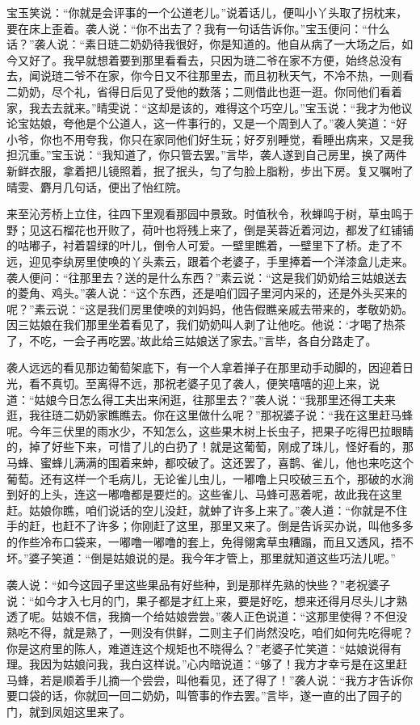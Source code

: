 宝玉笑说：“你就是会评事的一个公道老儿。”说着话儿，便叫小丫头取了拐枕来，要在床上歪着。袭人说：“你不出去了？我有一句话告诉你。”宝玉便问：“什么话？”袭人说：“素日琏二奶奶待我很好，你是知道的。他自从病了一大场之后，如今又好了。我早就想着要到那里看看去，只因为琏二爷在家不方便，始终总没有去，闻说琏二爷不在家，你今日又不往那里去，而且初秋天气，不冷不热，一则看二奶奶，尽个礼，省得日后见了受他的数落；二则借此也逛一逛。你同他们看着家，我去去就来。”晴雯说：“这却是该的，难得这个巧空儿。”宝玉说：“我才为他议论宝姑娘，夸他是个公道人，这一件事行的，又是一个周到人了。”袭人笑道：“好小爷，你也不用夸我，你只在家同他们好生玩；好歹别睡觉，看睡出病来，又是我担沉重。”宝玉说：“我知道了，你只管去罢。”言毕，袭人遂到自己房里，换了两件新鲜衣服，拿着把儿镜照着，抿了抿头，匀了匀脸上脂粉，步出下房。复又嘱咐了晴雯、麝月几句话，便出了怡红院。

来至沁芳桥上立住，往四下里观看那园中景致。时值秋令，秋蝉鸣于树，草虫鸣于野；见这石榴花也开败了，荷叶也将残上来了，倒是芙蓉近着河边，都发了红铺铺的咕嘟子，衬着碧绿的叶儿，倒令人可爱。一壁里瞧着，一壁里下了桥。走了不远，迎见李纨房里使唤的丫头素云，跟着个老婆子，手里捧着一个洋漆盒儿走来。袭人便问：“往那里去？送的是什么东西？”素云说：“这是我们奶奶给三姑娘送去的菱角、鸡头。”袭人说：“这个东西，还是咱们园子里河内采的，还是外头买来的呢？”素云说：“这是我们房里使唤的刘妈妈，他告假瞧亲戚去带来的，孝敬奶奶。因三姑娘在我们那里坐着看见了，我们奶奶叫人剥了让他吃。他说：‘才喝了热茶了，不吃，一会子再吃罢。’故此给三姑娘送了家去。”言毕，各自分路走了。

袭人远远的看见那边葡萄架底下，有一个人拿着掸子在那里动手动脚的，因迎着日光，看不真切。至离得不远，那祝老婆子见了袭人，便笑嘻嘻的迎上来，说道：“姑娘今日怎么得工夫出来闲逛，往那里去？”袭人说：“我那里还得工夫来逛，我往琏二奶奶家瞧瞧去。你在这里做什么呢？”那祝婆子说：“我在这里赶马蜂呢。今年三伏里的雨水少，不知怎么，这些果木树上长虫子，把果子吃得巴拉眼睛的，掉了好些下来，可惜了儿的白扔了！就是这葡萄，刚成了珠儿，怪好看的，那马蜂、蜜蜂儿满满的围着来蚛，都咬破了。这还罢了，喜鹊、雀儿，他也来吃这个葡萄。还有这样一个毛病儿，无论雀儿虫儿，一嘟噜上只咬破三五个，那破的水淌到好的上头，连这一嘟噜都是要烂的。这些雀儿、马蜂可恶着呢，故此我在这里赶。姑娘你瞧，咱们说话的空儿没赶，就蚛了许多上来了。”袭人道：“你就是不住手的赶，也赶不了许多；你刚赶了这里，那里又来了。倒是告诉买办说，叫他多多的作些冷布口袋来，一嘟噜一嘟噜的套上，免得翎禽草虫糟蹋，而且又透风，捂不坏。”婆子笑道：“倒是姑娘说的是。我今年才管上，那里就知道这些巧法儿呢。”

袭人说：“如今这园子里这些果品有好些种，到是那样先熟的快些？”老祝婆子说：“如今才入七月的门，果子都是才红上来，要是好吃，想来还得月尽头儿才熟透了呢。姑娘不信，我摘一个给姑娘尝尝。”袭人正色说道：“这那里使得？不但没熟吃不得，就是熟了，一则没有供鲜，二则主子们尚然没吃，咱们如何先吃得呢？你是这府里的陈人，难道连这个规矩也不晓得么？”老婆子忙笑道：“姑娘说得有理。我因为姑娘问我，我白这样说。”心内暗说道：“够了！我方才幸亏是在这里赶马蜂，若是顺着手儿摘一个尝尝，叫他看见，还了得了！”袭人说：“我方才告诉你要口袋的话，你就回一回二奶奶，叫管事的作去罢。”言毕，遂一直的出了园子的门，就到凤姐这里来了。


